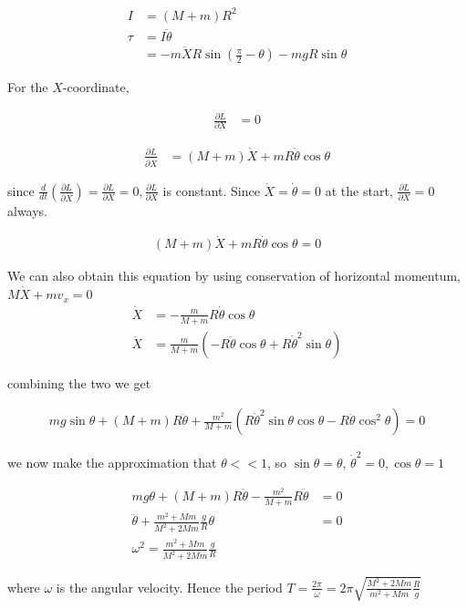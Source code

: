 \documentclass{article}
\begin{document}
\begin{align*}
I &= (M+m)R^2 \\
\tau &= I \ddot\theta \\
&= - m\ddot X R \sin(\frac{\pi}{2} - \theta) - mgR\sin\theta
\end{align*}

For the $X$-coordinate,

\begin{align*}
\frac{\partial L}{\partial X} &= 0
\end{align*}

\begin{align*}
\frac{\partial L}{\partial \dot X} &= (M+m) \dot{X} + mR\dot\theta\cos\theta
\end{align*}

since $\frac{d}{dt}\left(\frac{\partial L}{\partial \dot X}\right) = \frac{\partial L}{\partial X} = 0, \frac{\partial L}{\partial X}$ is constant. Since $\dot X = \dot\theta = 0$ at the start, $\frac{\partial L}{\partial X} = 0$ always.

\begin{align*}
(M+m) \dot{X} + mR\dot\theta\cos\theta = 0
\end{align*}

We can also obtain this equation by using conservation of horizontal momentum, $M\dot X + mv_x = 0$
\begin{align*}
\dot{X} &= -\frac{m}{M+m} R\dot\theta\cos\theta \\
\ddot{X} &= \frac{m}{M+m} (-R\ddot\theta\cos\theta + R\dot\theta^2\sin\theta)
\end{align*}

combining the two we get

\begin{align*}
mg\sin\theta + (M+m) R \ddot{\theta} + \frac{m^2}{M+m}(R\dot\theta^2\sin\theta\cos\theta - R\ddot\theta\cos^2\theta) = 0
\end{align*}

we now make the approximation that $\theta << 1$, so $\sin\theta = \theta$, $\dot\theta^2 = 0, \cos\theta = 1$

\begin{align*}
mg\theta + (M+m) R \ddot{\theta} - \frac{m^2}{M+m}R\ddot\theta &= 0 \\
\ddot\theta + \frac{m^2 + Mm}{M^2 + 2Mm}\frac{g}{R}\theta &= 0 \\
\omega^2 = \frac{m^2 + Mm}{M^2 + 2Mm}\frac{g}{R}
\end{align*}

where $\omega$ is the angular velocity. Hence the period $T = \frac{2\pi}{\omega} = 2\pi \sqrt{\frac{M^2 + 2Mm}{m^2 + Mm}\frac{R}{g}}$
\end{document}
